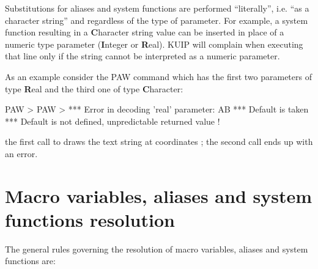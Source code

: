 
Substitutions for aliases and system functions
are performed ``literally'', i.e. ``as a character string''
and regardless of the type of parameter.
For example, a system function resulting in a {\bf C}haracter string value
can be inserted in place of a numeric type parameter
({\bf I}nteger or {\bf R}eal).
KUIP will complain when
executing that line only if the string cannot be interpreted as
a numeric parameter.

As an example consider the PAW command
 which has
the first two parameters of type {\bf R}eal and the third
one of type {\bf C}haracter:
\begin{XMP}
PAW > 
PAW > 
*** Error in decoding 'real' parameter: AB
*** Default is taken
*** Default is not defined, unpredictable returned value !
\end{XMP}
the first call to  draws the text string  at
coordinates ; the second call ends up with an error.
%
%
\section*{Macro variables, aliases and system functions resolution}

 
The general rules governing the resolution of macro variables,
aliases and system functions are:

